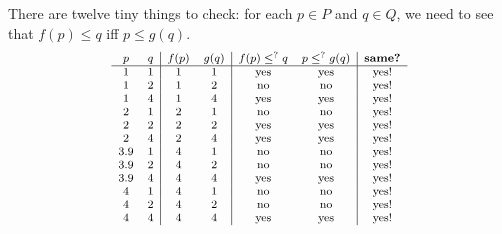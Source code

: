 \documentclass[7Sketches]{subfiles}
\begin{document}
{There are twelve tiny things to check: for each $p\in P$ and $q\in Q$, we need to see that $f(p)\leq q$ iff $p\leq g(q)$.
\[\footnotesize
\begin{array}{cc|cc|cc|c}
	p&q&f(p)&g(q)&f(p)\leq^?q&p\leq^?g(q)&\textbf{same?}\\\hline
	1&1&1&1&\text{yes}&\text{yes}&\text{yes!}\\
	1&2&1&2&\text{no}&\text{no}&\text{yes!}\\
	1&4&1&4&\text{yes}&\text{yes}&\text{yes!}\\
	2&1&2&1&\text{no}&\text{no}&\text{yes!}\\
	2&2&2&2&\text{yes}&\text{yes}&\text{yes!}\\
	2&4&2&4&\text{yes}&\text{yes}&\text{yes!}\\
	3.9&1&4&1&\text{no}&\text{no}&\text{yes!}\\
	3.9&2&4&2&\text{no}&\text{no}&\text{yes!}\\
	3.9&4&4&4&\text{yes}&\text{yes}&\text{yes!}\\
	4&1&4&1&\text{no}&\text{no}&\text{yes!}\\
	4&2&4&2&\text{no}&\text{no}&\text{yes!}\\
	4&4&4&4&\text{yes}&\text{yes}&\text{yes!}
\end{array}
\]
}  
\end{document}
